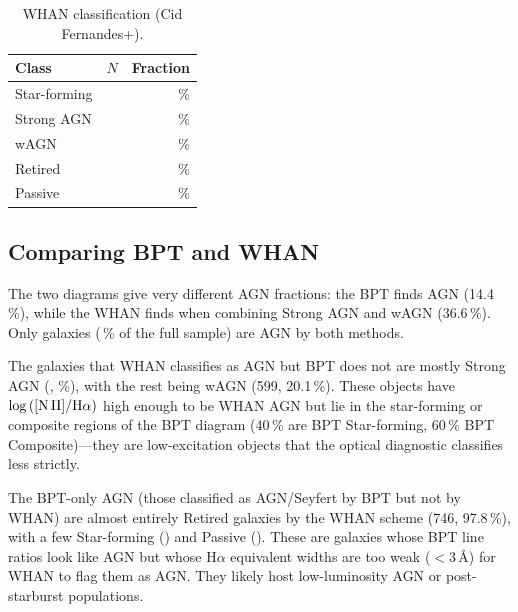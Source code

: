 \documentclass[a4paper,12pt]{article}
\begin{document}
\begin{table}[htbp]
  \centering
  \caption{WHAN classification (Cid Fernandes+\whanPassCount{}).}
  \label{tab:whan_stats}
  \begin{tabular}{lrr}
    \toprule
    Class & $N$ & Fraction \\
    \midrule
    Star-forming & \whanSfCount{} & \whanSfPct{}\,\% \\
    Strong AGN   & \whanStrongCount{} & \whanStrongPct{}\,\% \\
    wAGN         &   \whanWagnCount{} &  \whanWagnPct{}\,\% \\
    Retired      & \whanRetCount{} & \whanRetPct{}\,\% \\
    Passive      &    \whanPassCount{} &  \whanPassPct{}\,\% \\
    \bottomrule
  \end{tabular}
\end{table}

\subsection{Comparing BPT and WHAN}

The two diagrams give very different AGN fractions: the BPT finds
\wiseAgnSample{} AGN (14.4\,\%), while the WHAN finds \whanAgnTotCount{} when combining Strong
AGN and wAGN (36.6\,\%).  Only \bothAgnCount{} galaxies (\bothAgnPct{}\,\% of the full
sample) are AGN by both methods.

The \whanOnlyCount{} galaxies that WHAN classifies as AGN but BPT does not are
mostly Strong AGN (\woStrongCount{}, \woStrongPct{}\%), with the rest being wAGN (599,
20.1\,\%).  These objects have $\log\,([{\rm N\,II}]/{\rm H}\alpha)$ high
enough to be WHAN AGN but lie in the star-forming or composite regions
of the BPT diagram (40\,\% are BPT Star-forming, 60\,\% BPT
Composite)---they are low-excitation objects that the optical diagnostic
classifies less strictly.

The \bptOnlyCount{} BPT-only AGN (those classified as AGN/Seyfert by BPT but not
by WHAN) are almost entirely Retired galaxies by the WHAN scheme (746,
97.8\,\%), with a few Star-forming (\boSfCount{}) and Passive (\boPassCount{}).  These are
galaxies whose BPT line ratios look like AGN but whose H$\alpha$
equivalent widths are too weak ($<3$\,\AA) for WHAN to flag them as
AGN.  They likely host low-luminosity AGN or post-starburst
populations.

\end{document}
